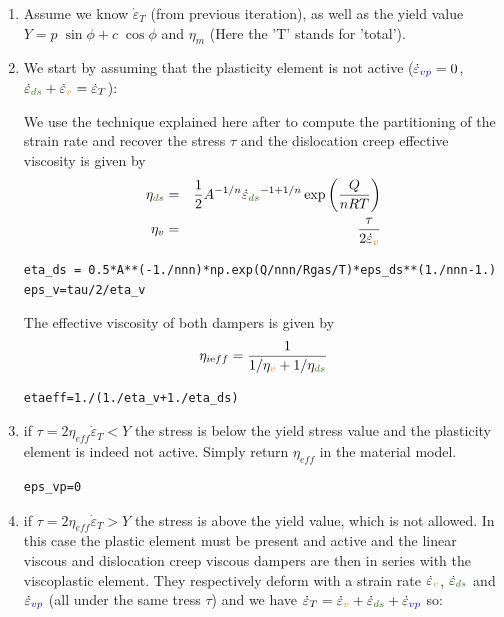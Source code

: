 \begin{enumerate}
\item Assume we know $\dot\varepsilon_T$ (from previous iteration), 
as well as the yield value  $Y = p\; \sin\phi + c \; \cos \phi$ and $\eta_m$ (Here the 'T' stands 
for 'total').

\item We start by assuming that the plasticity element is not active 
($\dot{\varepsilon}_{\color{blue}vp}=0$, $\dot{\varepsilon}_{\color{OliveGreen}ds}
+\dot{\varepsilon}_{\color{orange} v} =\dot{\varepsilon}_T$): 

We use the technique explained here after to compute the partitioning of the strain rate
and recover the stress $\tau$ and the dislocation creep effective viscosity
is given by 
\begin{eqnarray}
\eta_{\color{OliveGreen}ds} &=& \frac{1}{2} A^{-1/n} 
\dot{\varepsilon}_{\color{OliveGreen}ds}^{-1+1/n} \exp \left( \frac{Q}{nRT} \right) \nn\\
\eta_v &=& \frac{\tau}{2 \dot{\varepsilon}_{\color{orange}v}}  \nn
\end{eqnarray}
\begin{lstlisting}
eta_ds = 0.5*A**(-1./nnn)*np.exp(Q/nnn/Rgas/T)*eps_ds**(1./nnn-1.)
eps_v=tau/2/eta_v
\end{lstlisting}
The effective viscosity of both dampers is given by 
\[
\eta_{i\text eff}=\frac{1}{1/\eta_{\color{orange}v}+1/\eta_{\color{OliveGreen}ds}}
\]
\begin{lstlisting}
etaeff=1./(1./eta_v+1./eta_ds)
\end{lstlisting}

\item if $\tau =2 {\eta}_{eff} \dot\varepsilon_T < Y$ the stress is below the yield stress value 
and the plasticity element is indeed not active. 
Simply return ${\eta}_{eff}$ in the material model.
\begin{lstlisting}
eps_vp=0
\end{lstlisting}

\item if $\tau=2 \eta_{eff} \dot\varepsilon_T > Y$ the stress is above the 
yield value, which is not allowed. In this case the plastic element must be present 
and active and the linear viscous and dislocation creep viscous dampers are then 
in series with the viscoplastic element. 
They  respectively deform with a strain rate $\dot{\varepsilon}_{\color{orange}v}$, 
$\dot{\varepsilon}_{\color{OliveGreen}ds}$ and $\dot\varepsilon_{\color{blue}vp}$ 
(all under the same tress $\tau$) 
and we have  
$\dot\varepsilon_T = \dot{\varepsilon}_{\color{orange}v} +
\dot{\varepsilon}_{\color{OliveGreen}ds} + \dot\varepsilon_{\color{blue}vp}$ so:


\end{enumerate}
